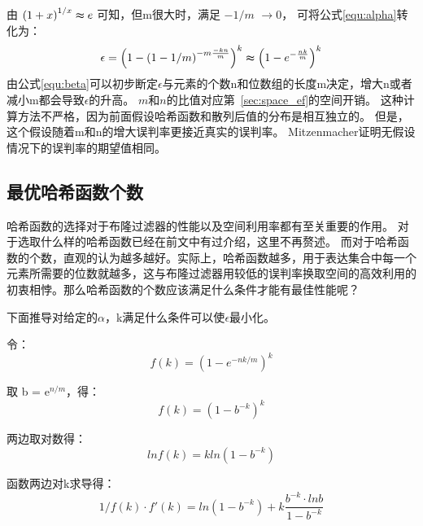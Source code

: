 由
\begin{math} \left(1 + x\right)^{{1/x}} \thickapprox e \end{math}
可知，但m很大时，满足
$-{1/m}$ $\to 0$，
可将公式\ref{equ:alpha}转化为：
\begin{equation}
\epsilon = \left(1 - \left(1 - {1/m}\right)^{{-m}\frac{-kn}{m}}\right)^k \thickapprox \left(1 - e^{-\frac{nk}{m}}\right)^k
\label{equ:beta}
\end{equation}
由公式\ref{equ:beta}可以初步断定\begin{math}\epsilon\end{math}与元素的个数n和位数组的长度m决定，增大n或者减小m都会导致\begin{math}\epsilon\end{math}的升高。
$m$和$n$的比值对应第~\ref{sec:space_ef}的空间开销。
这种计算方法不严格，因为前面假设哈希函数和散列后值的分布是相互独立的。
但是，这个假设随着m和n的增大误判率更接近真实的误判率。
Mitzenmacher证明无假设情况下的误判率的期望值相同\cite{mitzenmacher2002compressed}。

\subsection{最优哈希函数个数}
\label{sec:num_hashf}
哈希函数的选择对于布隆过滤器的性能以及空间利用率都有至关重要的作用。
对于选取什么样的哈希函数已经在前文中有过介绍，这里不再赘述。
而对于哈希函数的个数，直观的认为越多越好。实际上，哈希函数越多，用于表达集合中每一个元素所需要的位数就越多，这与布隆过滤器用较低的误判率换取空间的高效利用的初衷相悖。那么哈希函数的个数应该满足什么条件才能有最佳性能呢？

下面推导对给定的$\alpha$，k满足什么条件可以使$\epsilon$最小化。

令：
\begin{equation}
f\left(k\right) = \left(1 - e^{-{nk/m}}\right)^k 
\end{equation}

取 b = e$^{n/m}$，得：
\begin{equation}
f\left(k\right) = \left(1 - b^{-k}\right)^k 
\end{equation}

两边取对数得： 
\begin{equation}
lnf\left(k\right) = kln\left(1 - b^{-k}\right)
\end{equation}

函数两边对k求导得：
\begin{equation}
{1/f(k)}\cdot f'(k) = ln(1 - b^{-k}) + k \frac{b^{-k}\cdot lnb}{1 - b^{-k}} 
\label{equ:fk}
\end{equation}

